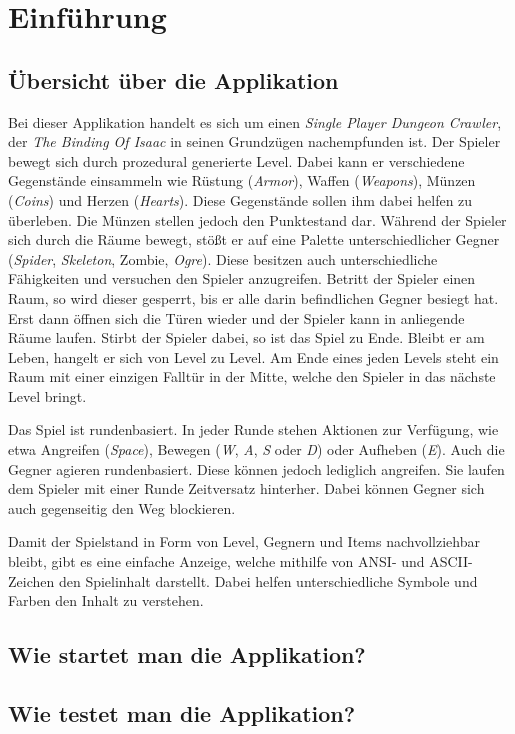 \chapter{Einführung}

\section{Übersicht über die Applikation}
Bei dieser Applikation handelt es sich um einen
\textit{Single Player Dungeon Crawler}, der
\textit{The Binding Of Isaac} in seinen Grundzügen nachempfunden ist.
Der Spieler bewegt sich durch prozedural generierte Level. Dabei kann
er verschiedene Gegenstände einsammeln wie Rüstung (\textit{Armor}),
Waffen (\textit{Weapons}), Münzen (\textit{Coins}) und Herzen
(\textit{Hearts}). Diese Gegenstände sollen ihm dabei helfen zu
überleben. Die Münzen stellen jedoch den Punktestand dar.
Während der Spieler sich durch die Räume bewegt, stößt er
auf eine Palette unterschiedlicher Gegner (\textit{Spider}, 
\textit{Skeleton}, {Zombie}, \textit{Ogre}). Diese besitzen auch
unterschiedliche Fähigkeiten und versuchen den Spieler anzugreifen.
Betritt der Spieler einen Raum, so wird dieser gesperrt, bis er alle
darin befindlichen Gegner besiegt hat. Erst dann öffnen sich die Türen
wieder und der Spieler kann in anliegende Räume laufen.
Stirbt der Spieler dabei, so ist das Spiel zu Ende. Bleibt er am Leben,
hangelt er sich von Level zu Level. Am Ende eines jeden Levels steht
ein Raum mit einer einzigen Falltür in der Mitte, welche den Spieler
in das nächste Level bringt.

Das Spiel ist rundenbasiert. In jeder Runde stehen Aktionen zur 
Verfügung, wie etwa Angreifen (\textit{Space}), Bewegen
(\textit{W}, \textit{A}, \textit{S} oder \textit{D}) oder Aufheben
(\textit{E}). Auch die Gegner agieren rundenbasiert. Diese können
jedoch lediglich angreifen. Sie laufen dem Spieler mit einer Runde
Zeitversatz hinterher. Dabei können Gegner sich auch gegenseitig den
Weg blockieren.

Damit der Spielstand in Form von Level, Gegnern und Items nachvollziehbar
bleibt, gibt es eine einfache Anzeige, welche mithilfe von ANSI- und
ASCII-Zeichen den Spielinhalt darstellt. Dabei helfen unterschiedliche
Symbole und Farben den Inhalt zu verstehen.

\section{Wie startet man die Applikation?}

\section{Wie testet man die Applikation?}
